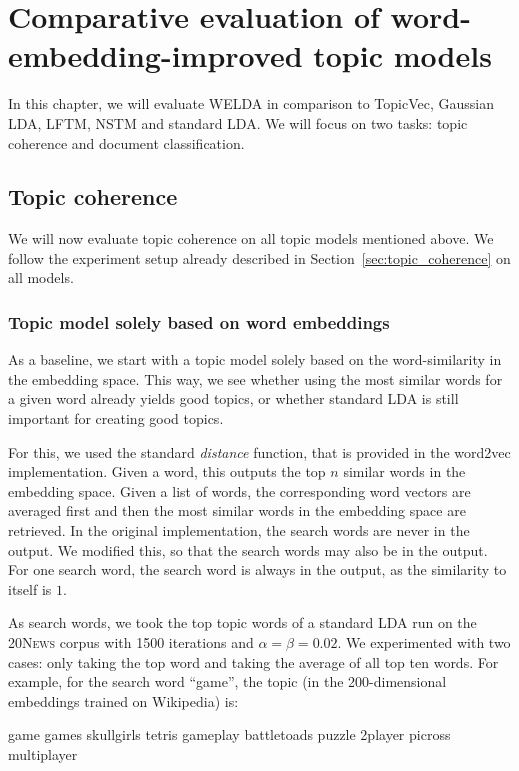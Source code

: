 \documentclass[
        a4paper,
        titlepage,
        twoside,
        parskip,
        numbers=noenddot
        ]{scrbook}
\newcommand{\topicbox}[1]{
  \setlength{\OuterFrameSep}{0pt}
  \begin{framed}
    #1
  \end{framed}
}
\theoremstyle{break}
\begin{document}
\chapter{Comparative evaluation of word-embedding-improved topic models}
\label{sec:comparative_evaluation}

In this chapter, we will evaluate WELDA in comparison to TopicVec, Gaussian LDA, LFTM, NSTM and standard LDA.
We will focus on two tasks: topic coherence and document classification.

\section{Topic coherence}
\label{sec:evaluation_topic_coherence}

We will now evaluate topic coherence on all topic models mentioned above.
We follow the experiment setup already described in Section~\ref{sec:topic_coherence} on all models.

\subsection{Topic model solely based on word embeddings}
\label{sec:raw_tm_we}
As a baseline, we start with a topic model solely based on the word-similarity in the embedding space.
This way, we see whether using the most similar words for a given word already yields good topics, or whether standard LDA is still important for creating good topics.

For this, we used the standard \emph{distance} function, that is provided in the word2vec implementation.
Given a word, this outputs the top $n$ similar words in the embedding space.
Given a list of words, the corresponding word vectors are averaged first and then the most similar words in the embedding space are retrieved.
In the original implementation, the search words are never in the output.
We modified this, so that the search words may also be in the output.
For one search word, the search word is always in the output, as the similarity to itself is $1$.

As search words, we took the top topic words of a standard LDA run on the \textsc{20News} corpus with 1500 iterations and $\alpha = \beta = 0.02$.
We experimented with two cases: only taking the top word and taking the average of all top ten words.
For example, for the search word ``game'', the topic (in the 200-dimensional embeddings trained on Wikipedia) is:
\topicbox{\noindent game games skullgirls tetris gameplay battletoads puzzle 2player picross multiplayer}
\end{document}
